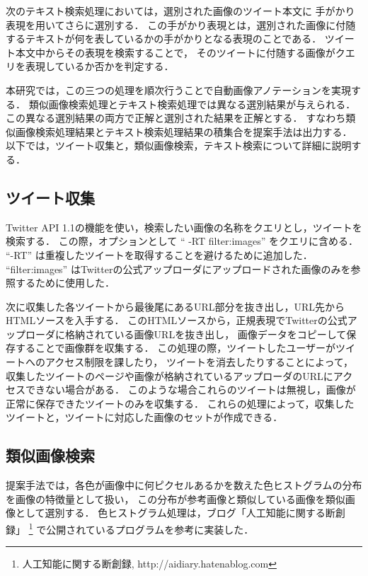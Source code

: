 \documentclass{deimj}
\begin{document}
次のテキスト検索処理においては，選別された画像のツイート本文に
手がかり表現を用いてさらに選別する．
この手がかり表現とは，選別された画像に付随するテキストが何を表しているかの手がかりとなる表現のことである．
ツイート本文中からその表現を検索することで，
そのツイートに付随する画像がクエリを表現しているか否かを判定する．

本研究では，この三つの処理を順次行うことで自動画像アノテーションを実現する．
類似画像検索処理とテキスト検索処理では異なる選別結果が与えられる．
この異なる選別結果の両方で正解と選別された結果を正解とする．
すなわち類似画像検索処理結果とテキスト検索処理結果の積集合を提案手法は出力する．
以下では，ツイート収集と，類似画像検索，テキスト検索について詳細に説明する．

\subsection{ツイート収集}
\label{sec:tweetCollect}
Twitter API 1.1の機能を使い，検索したい画像の名称をクエリとし，ツイートを検索する．
この際，オプションとして “ -RT filter:images” をクエリに含める．
“-RT” は重複したツイートを取得することを避けるために追加した．
“filter:images” はTwitterの公式アップローダにアップロードされた画像のみを参照するために使用した．

次に収集した各ツイートから最後尾にあるURL部分を抜き出し，URL先からHTMLソースを入手する．
このHTMLソースから，正規表現でTwitterの公式アップローダに格納されている画像URLを抜き出し，
画像データをコピーして保存することで画像群を収集する．
この処理の際，ツイートしたユーザーがツイートへのアクセス制限を課したり，
ツイートを消去したりすることによって，
収集したツイートのページや画像が格納されているアップローダのURLにアクセスできない場合がある．
このような場合これらのツイートは無視し，画像が正常に保存できたツイートのみを収集する．
これらの処理によって，収集したツイートと，ツイートに対応した画像のセットが作成できる．


\subsection{類似画像検索}
\label{sec:similar}

提案手法では，各色が画像中に何ピクセルあるかを数えた色ヒストグラムの分布を画像の特徴量として扱い，
この分布が参考画像と類似している画像を類似画像として選別する\cite{Datta08imageretrieval:}．
色ヒストグラム処理は，ブログ「人工知能に関する断創録」
\footnote{人工知能に関する断創録, http:\slash\slash{}aidiary.hatenablog.com}
で公開されているプログラムを参考に実装した．
\end{document}
